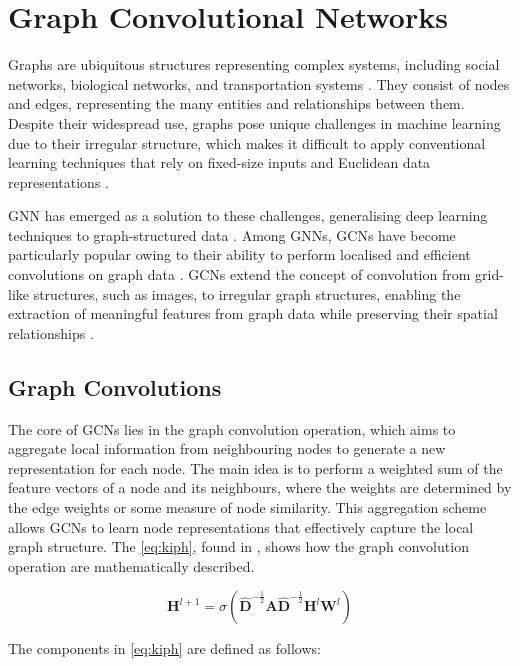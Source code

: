 
\section{Graph Convolutional Networks}

Graphs are ubiquitous structures representing complex systems, including social networks, biological networks, and transportation systems \autocite{scarselli2008graph}. They consist of nodes and edges, representing the many entities and relationships between them. Despite their widespread use, graphs pose unique challenges in machine learning due to their irregular structure, which makes it difficult to apply conventional learning techniques that rely on fixed-size inputs and Euclidean data representations \autocite{battaglia2018relational}.

\Gls{GNN} has emerged as a solution to these challenges, generalising deep learning techniques to graph-structured data \autocite{gori2005new}. Among GNNs, GCNs have become particularly popular owing to their ability to perform localised and efficient convolutions on graph data \autocite{DBLP:journals/corr/KipfW16}. GCNs extend the concept of convolution from grid-like structures, such as images, to irregular graph structures, enabling the extraction of meaningful features from graph data while preserving their spatial relationships \autocite{bronstein2017geometric}. 

\subsection{Graph Convolutions}
The core of GCNs lies in the graph convolution operation, which aims to aggregate local information from neighbouring nodes to generate a new representation for each node. The main idea is to perform a weighted sum of the feature vectors of a node and its neighbours, where the weights are determined by the edge weights or some measure of node similarity. This aggregation scheme allows GCNs to learn node representations that effectively capture the local graph structure. The \cref{eq:kiph}, found in \autocite{DBLP:journals/corr/KipfW16}, shows how the graph convolution operation are mathematically described.

\begin{equation*} 
    \bm{H}^{l+1} = \sigma(\bm{\hat{D}}^{-\frac{1}{2}} \bm{A} \bm{\hat{D}}^{-\frac{1}{2}} \bm{H}^{l} \bm{W}^{l} )
    \label{eq:kiph}
\end{equation*}


The components in \cref{eq:kiph} are defined as follows:

